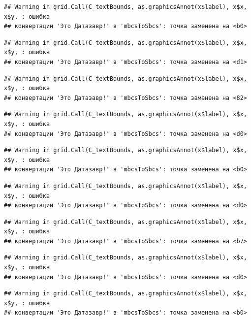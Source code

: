 \documentclass[]{book}
\begin{document}
\begin{verbatim}
## Warning in grid.Call(C_textBounds, as.graphicsAnnot(x$label), x$x, x$y, : ошибка
## конвертации 'Это Датазавр!' в 'mbcsToSbcs': точка заменена на <b0>
\end{verbatim}

\begin{verbatim}
## Warning in grid.Call(C_textBounds, as.graphicsAnnot(x$label), x$x, x$y, : ошибка
## конвертации 'Это Датазавр!' в 'mbcsToSbcs': точка заменена на <d1>
\end{verbatim}

\begin{verbatim}
## Warning in grid.Call(C_textBounds, as.graphicsAnnot(x$label), x$x, x$y, : ошибка
## конвертации 'Это Датазавр!' в 'mbcsToSbcs': точка заменена на <82>
\end{verbatim}

\begin{verbatim}
## Warning in grid.Call(C_textBounds, as.graphicsAnnot(x$label), x$x, x$y, : ошибка
## конвертации 'Это Датазавр!' в 'mbcsToSbcs': точка заменена на <d0>
\end{verbatim}

\begin{verbatim}
## Warning in grid.Call(C_textBounds, as.graphicsAnnot(x$label), x$x, x$y, : ошибка
## конвертации 'Это Датазавр!' в 'mbcsToSbcs': точка заменена на <b0>
\end{verbatim}

\begin{verbatim}
## Warning in grid.Call(C_textBounds, as.graphicsAnnot(x$label), x$x, x$y, : ошибка
## конвертации 'Это Датазавр!' в 'mbcsToSbcs': точка заменена на <d0>
\end{verbatim}

\begin{verbatim}
## Warning in grid.Call(C_textBounds, as.graphicsAnnot(x$label), x$x, x$y, : ошибка
## конвертации 'Это Датазавр!' в 'mbcsToSbcs': точка заменена на <b7>
\end{verbatim}

\begin{verbatim}
## Warning in grid.Call(C_textBounds, as.graphicsAnnot(x$label), x$x, x$y, : ошибка
## конвертации 'Это Датазавр!' в 'mbcsToSbcs': точка заменена на <d0>
\end{verbatim}

\begin{verbatim}
## Warning in grid.Call(C_textBounds, as.graphicsAnnot(x$label), x$x, x$y, : ошибка
## конвертации 'Это Датазавр!' в 'mbcsToSbcs': точка заменена на <b0>
\end{verbatim}
\end{document}

